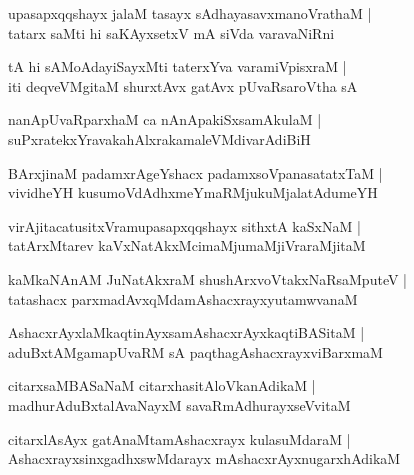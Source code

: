 \documentclass[twoside,12pt,openright]{book}
\newcounter{shloka}[chapter]
\begin{document}
\begin{shloka}%
upasapxqqshayx jalaM tasayx sAdhayasavxmanoVrathaM |\\
tatarx saMti hi saKAyxsetxV mA siVda varavaNiRni
\end{shloka}

\begin{shloka}%
tA hi sAMoAdayiSayxMti taterxYva varamiVpisxraM |\\
iti deqveVMgitaM shurxtAvx gatAvx pUvaRsaroVtha sA 
\end{shloka}

\begin{shloka}%
nanApUvaRparxhaM ca nAnApakiSxsamAkulaM |\\
suPxratekxYravakahAlxrakamaleVMdivarAdiBiH 
\end{shloka}

\begin{shloka}%
BArxjinaM padamxrAgeYshacx padamxsoVpanasatatxTaM |\\
vividheYH kusumoVdAdhxmeYmaRMjukuMjalatAdumeYH
\end{shloka}

\begin{shloka}%
virAjitacatusitxVramupasapxqqshayx sithxtA kaSxNaM |\\
tatArxMtarev kaVxNatAkxMcimaMjumaMjiVraraMjitaM 
\end{shloka}

\begin{shloka}%
kaMkaNAnAM JuNatAkxraM shushArxvoVtakxNaRsaMputeV |\\
tatashacx parxmadAvxqMdamAshacxrayxyutamwvanaM 
\end{shloka}

\begin{shloka}%
AshacxrAyxlaMkaqtinAyxsamAshacxrAyxkaqtiBASitaM |\\
aduBxtAMgamapUvaRM sA paqthagAshacxrayxviBarxmaM 
\end{shloka}

\begin{shloka}%
citarxsaMBASaNaM citarxhasitAloVkanAdikaM |\\
madhurAduBxtalAvaNayxM savaRmAdhurayxseVvitaM 
\end{shloka}

\begin{shloka}%
citarxlAsAyx gatAnaMtamAshacxrayx kulasuMdaraM |\\
AshacxrayxsinxgadhxswMdarayx mAshacxrAyxnugarxhAdikaM 
\end{shloka}
\end{document}
